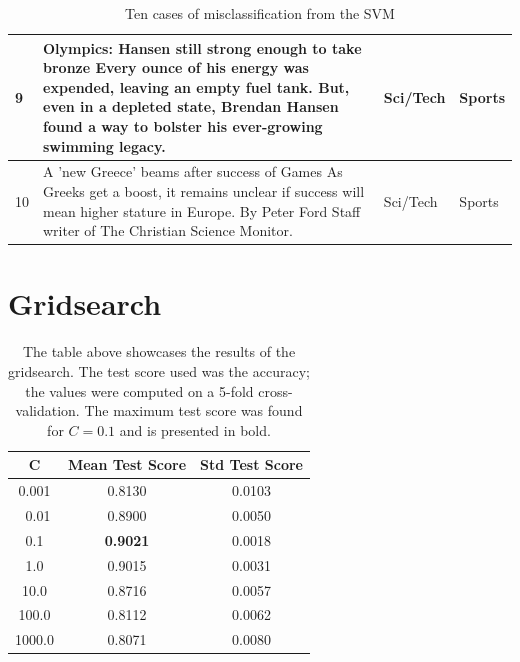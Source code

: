 \documentclass[12pt,a4paper,english]{article}
\begin{document}
\begin{table}[!h]
\begin{longtable}{| m{2em} | m{25em} | m{5em} | m{5em} |}
9 \label{ref9} & Olympics: Hansen still strong enough to take bronze Every ounce of his energy was expended, leaving an empty fuel tank. But, even in a depleted state, Brendan Hansen found a way to bolster his ever-growing swimming legacy. & Sci/Tech & Sports \\ \hline
10 \label{ref10} & A 'new Greece' beams after success of Games As Greeks get a boost, it remains unclear if success will mean higher stature in Europe. By Peter Ford Staff writer of The Christian Science Monitor. & Sci/Tech & Sports \\ \hline
    
\end{longtable}

\caption{Ten cases of misclassification from the SVM}
\label{tab:misclassSVM}
\end{table}


\section{Gridsearch}\label{ap:gridsearch}

\begin{table}[htbp]
\centering
\begin{tabular}{|c|c|c|}
\hline
\textbf{C} & \textbf{Mean Test Score} & \textbf{Std Test Score} \\
\hline
0.001  & 0.8130 & 0.0103 \\\
0.01   & 0.8900 & 0.0050 \\
0.1    & \textbf{0.9021} & 0.0018 \\
1.0    & 0.9015 & 0.0031 \\
10.0   & 0.8716 & 0.0057 \\
100.0  & 0.8112 & 0.0062 \\
1000.0 & 0.8071 & 0.0080 \\
\hline

\end{tabular}
\caption{The table above showcases the results of the gridsearch. The test score used was the accuracy; the values were computed on a 5-fold cross-validation. The maximum test score was found for $C=0.1$ and is presented in bold.}
\end{table}
\end{document}
